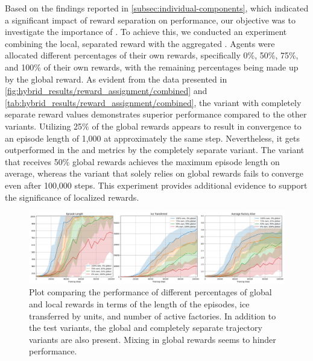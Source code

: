 \noindent Based on the findings reported in \autoref{subsec:individual-components}, which indicated a significant impact of reward separation on performance, our objective was to investigate the importance of . To achieve this, we conducted an experiment combining the local, separated reward with the aggregated . Agents were allocated different percentages of their own rewards, specifically 0\%, 50\%, 75\%, and 100\% of their own rewards, with the remaining percentages being made up by the global reward. As evident from the data presented in \autoref{fig:hybrid_results/reward_assignment/combined} and \autoref{tab:hybrid_results/reward_assignment/combined}, the variant with completely separate reward values demonstrates superior performance compared to the other variants. Utilizing 25\% of the global rewards appears to result in convergence to an episode length of 1,000 at approximately the same step. Nevertheless, it gets outperformed in the  and  metrics by the completely separate variant. The variant that receives 50\% global rewards achieves the maximum episode length on average, whereas the variant that solely relies on global rewards fails to converge even after 100,000 steps. This experiment provides additional evidence to support the significance of localized rewards.

\begin{figure}[htbp]
    \centering
    \includegraphics[width=1\linewidth]{images/results_hybrid/reward_assignment/combined.png}
    \captionsetup{justification=justified, singlelinecheck=false, width=1\linewidth, labelfont=bf} 
    \caption[]{Plot comparing the performance of different percentages of global and local rewards in terms of the length of the episodes, ice transferred by units, and number of active factories. In addition to the test variants, the global and completely separate trajectory variants are also present. Mixing in global rewards seems to hinder performance.}
    \label{fig:hybrid_results/reward_assignment/combined}
\end{figure}

